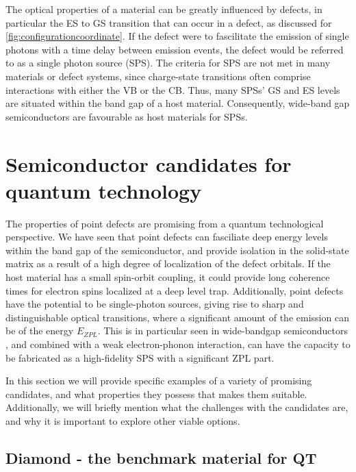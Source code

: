 The optical properties of a material can be greatly influenced by defects, in particular the ES to GS transition that can occur in a defect, as discussed for \autoref{fig:configurationcoordinate}. If the defect were to fascilitate the emission of single photons with a time delay between emission events, the defect would be referred to as a single photon source (SPS). The criteria for SPS are not met in many materials or defect systems, since charge-state transitions often comprise interactions with either the VB or the CB. Thus, many SPSs' GS and ES levels are situated within the band gap of a host material. Consequently, wide-band gap semiconductors are favourable as host materials for SPSs.

\section{Semiconductor candidates for quantum technology}

The properties of point defects are promising from a quantum technological perspective. We have seen that point defects can fasciliate deep energy levels within the band gap of the semiconductor, and provide isolation in the solid-state matrix as a result of a high degree of localization of the defect orbitals. If the host material has a small spin-orbit coupling, it could provide long coherence times for electron spins localized at a deep level trap. Additionally, point defects have the potential to be single-photon sources, giving rise to sharp and distinguishable optical transitions, where a significant amount of the emission can be of the energy $E_{ZPL}$. This is in particular seen in wide-bandgap semiconductors \cite{Gordon2013, Weber2010}, and combined with a weak electron-phonon interaction, can have the capacity to be fabricated as a high-fidelity SPS with a significant ZPL part.

In this section we will provide specific examples of a variety of promising candidates, and what properties they possess that makes them suitable. Additionally, we will briefly mention what the challenges with the candidates are, and why it is important to explore other viable options.

\subsection{Diamond - the benchmark material for QT}
\label{diamond}



